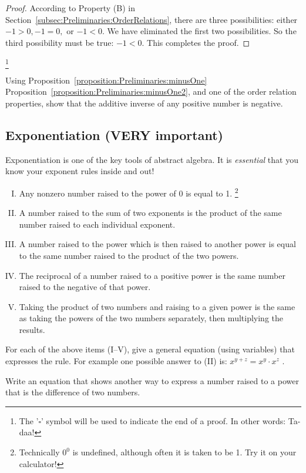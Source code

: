 \begin{proof}
\noindent
According to   Property (B) in  Section~\ref{subsec:Preliminaries:OrderRelations}, there are three  possibilities: either $-1>0, -1=0,$ or $-1<0$.  We have eliminated the first two possibilities.  So the third possibility must be true:  $-1<0$. This completes the proof.

\end{proof} 
\footnote{The '$\square$' symbol will be used to indicate the end of a proof. In other words: Ta-daa!}

\begin{exercise}{}
Using Proposition~\ref{proposition:Preliminaries:minusOne}  Proposition~\ref{proposition:Preliminaries:minusOne2}, and one of the order relation properties, show that the additive inverse of any positive number is negative.
\end{exercise}


\subsection {Exponentiation (VERY important)}
\label{subsec:Preliminaries:Exponentiation}

Exponentiation is one of the key tools of abstract algebra. It is \emph{essential} that you know your exponent rules inside and out!  

\begin{enumerate}[(I)]
\item
Any nonzero number raised to the power of 0 is equal to 1.
\footnote{ Technically $0^0$ is undefined, although often it is taken to be 1. Try it on your calculator!}
\item
A number raised to the sum of two exponents  is the product of the same number raised to each individual exponent.
\item
A number raised to the power which is then raised to another power is equal to the same number raised to the product of the two powers.
\item
The reciprocal of a number raised to a positive power is the same number raised to the negative of that power.
\item
Taking the  product of two numbers  and raising to a given power is the same as taking the powers of the two numbers separately, then multiplying the results.
\end{enumerate}

\begin{exercise}{5}
For each of the above items (I--V),  give a general equation (using variables) that expresses the rule.  For example one possible answer to (II) is:  $x^{y+z} = x^y \cdot x^z$ .
\end{exercise}
\begin{exercise}{6}
Write an equation that shows another way to express a number raised to a power that is the difference of two numbers.
\end{exercise}

